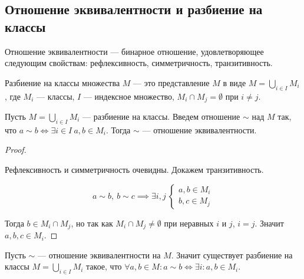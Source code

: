 \subsection{Отношение эквивалентности и разбиение на классы}

\begin{defn}
    Отношение эквивалентности --- бинарное отношение, 
    удовлетворяющее следующим свойствам: рефлексивность, симметричность, транзитивность.
\end{defn}

\begin{defn}
    Разбиение на классы множества $M$ --- это представление $M$ в виде 
    $M = \bigcup\limits_{i \in I} M_i$, 
    где $M_i$ --- классы, $I$ --- индексное множество, 
    $M_i \cap M_j = \emptyset$ при $i \neq j$.
\end{defn}

\begin{theorem}
    Пусть $M = \bigcup\limits_{i \in I} M_i$ --- разбиение на классы.
    Введем отношение $\sim$ над $M$ так, что $a \sim b \iff \exists i \in I \ a, b \in M_i$.
    Тогда $\sim$ --- отношение эквивалентности.
\end{theorem}

\begin{proof}~

    Рефлексивность и симметричность очевидны. Докажем транзитивность.
    
    \[ 
        a \sim b,\ b \sim c \implies 
        \exists i, j \ \begin{cases} a, b \in M_i \\ b, c \in M_j \end{cases}
    \]
    
    Тогда $b \in M_i \cap M_j$, но так как $M_i \cap M_j \neq \emptyset$ при неравных $i$ и $j$,
    $i = j$. Значит $a, b, c \in M_i$.
\end{proof}

\begin{theorem}
    Пусть $\sim$ --- отношение эквивалентности на $M$. 
    Значит существует разбиение на классы $M = \bigcup\limits_{i \in I} M_i$ такое, 
    что $\forall a, b \in M: a \sim b \iff \exists i : a, b \in M_i$.
\end{theorem}

